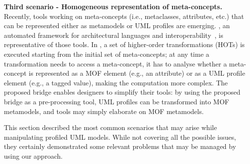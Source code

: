 \textbf{Third scenario - Homogeneous representation of meta-concepts.}
Recently, tools working on meta-concepts (i.e., metaclasses, attributes, etc.) that can be represented either
as metamodels or UML profiles are emerging. \dually{}, an automated framework for architectural languages and interoperability~\cite{duallyTSE}, is representative of those tools. In \dually{}, a set of higher-order transformations (HOTs) is executed starting from the initial set of meta-concepts; at any time a transformation needs to access a meta-concept, it has to analyse whether a meta-concept is represented as a MOF element (e.g., an attribute) or as a UML profile element (e.g., a tagged value), making the computation more complex.%
The proposed bridge enables designers to simplify their tools: by using the proposed bridge as a pre-processing tool, UML profiles can be transformed into MOF metamodels, and tools may simply elaborate on MOF metamodels. 
 

This section described the most common scenarios that may arise while manipulating profiled UML models. While not covering all the possible issues, they certainly demonstrated some relevant problems that may be managed by using our approach. 